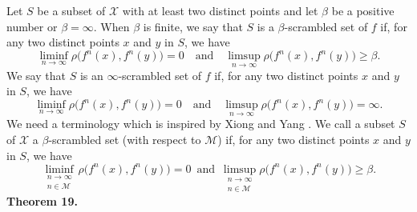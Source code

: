 \documentclass[12pt]{article}
\begin{document}
Let $S$ be a subset of $\mathcal X$ with at least two distinct points and let $\beta$ be a positive number or $\beta = \infty$.  When $\beta$ is finite, we say that $S$ is a $\beta$-scrambled set of $f$ if, for any two distinct points $x$ and $y$ in $S$, we have 
$$\liminf_{n \to \infty} \rho\big(f^n(x), f^n(y)\big) = 0 \quad \text{and} \quad \limsup_{n \to \infty} \rho\big(f^n(x), f^n(y)\big) \ge \beta.
$$  
We say that $S$ is an $\infty$-scrambled set of $f$ if, for any two distinct points $x$ and $y$ in $S$, we have 
$$\liminf_{n \to \infty} \rho\big(f^n(x), f^n(y)\big) = 0 \quad \text{and} \quad \limsup_{n \to \infty} \rho\big(f^n(x), f^n(y)\big) = \infty.
$$
\indent We need a terminology which is inspired by Xiong and Yang {\bf\cite{xiong}}.  We call a subset $S$ of $\mathcal X$ a $\beta$-scrambled set (with respect to $\mathcal M$) if, for any two distinct points $x$ and $y$ in $S$, we have
$$
\liminf_{\substack{n \to \infty \\ n \in \mathcal M}} \rho\big(f^n(x), f^n(y)\big) = 0 \,\,\, \text{and} \,\,\, \limsup_{\substack{n \to \infty \\ n \in \mathcal M}}  \rho\big(f^n(x), f^n(y)\big) \ge \beta.
$$
\noindent
{\bf Theorem 19.}
\end{document}
